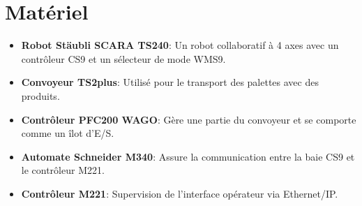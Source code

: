 
\section{Matériel}
\begin{itemize}
    \item \textbf{Robot Stäubli SCARA TS240}: Un robot collaboratif à 4 axes avec un contrôleur CS9 et un sélecteur de mode WMS9.
    \item \textbf{Convoyeur TS2plus}: Utilisé pour le transport des palettes avec des produits.
    \item \textbf{Contrôleur PFC200 WAGO}: Gère une partie du convoyeur et se comporte comme un îlot d’E/S.
    \item \textbf{Automate Schneider M340}: Assure la communication entre la baie CS9 et le contrôleur M221.
    \item \textbf{Contrôleur M221}: Supervision de l’interface opérateur via Ethernet/IP.
\end{itemize}
